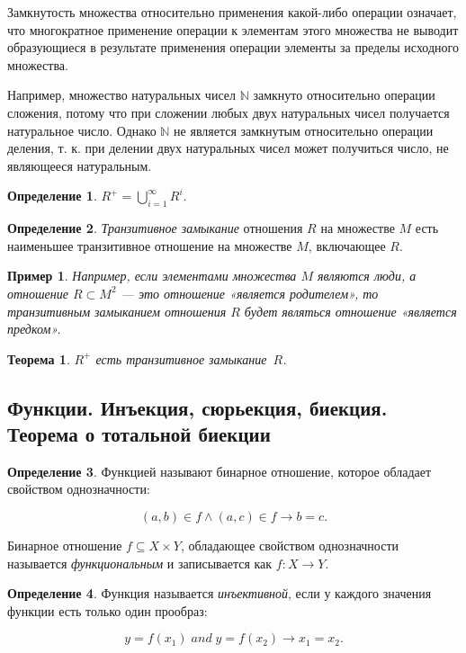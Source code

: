 \documentclass{article}
\newtheorem*{theorem*}{Теорема}
\theoremstyle{plain}
\newtheorem*{example*}{Пример}
\theoremstyle{definition}
\newtheorem{definition}{Определение}[subsection]
\begin{document}
Замкнутость множества относительно применения какой-либо операции означает, что многократное применение операции к элементам этого множества не выводит образующиеся в результате применения операции элементы за пределы исходного множества.

Например, множество натуральных чисел \(\mathbb{N}\) замкнуто относительно операции сложения, потому что при сложении любых двух натуральных чисел получается натуральное число. Однако \(\mathbb{N}\) не является замкнутым относительно операции деления, т. к. при делении двух натуральных чисел может получиться число, не являющееся натуральным.

\begin{definition}
	\(R^+ = \bigcup \limits ^{{\infty}} _{{i = 1}}R^{i}.\)
\end{definition}

\begin{definition}
	\textit{Транзитивное замыкание} отношения \(R\) на множестве \(M\) есть наименьшее транзитивное отношение на множестве \(M\), включающее \(R\).
\end{definition}

\begin{example*}
	Например, если элементами множества \(M\) являются люди, а отношение \(R \subset M^2\) — это отношение «является родителем», то транзитивным замыканием отношения \(R\) будет являться отношение «является предком».
\end{example*}

\begin{theorem*}
	\(R^+\) есть транзитивное замыкание~\(R\).
\end{theorem*}

\subsection{Функции. Инъекция, сюрьекция, биекция. Теорема о тотальной биекции}

\begin{definition}
	Функцией называют бинарное отношение, которое обладает свойством однозначности:

	\[
		(a, b) \in f \land (a, c) \in f \rightarrow b = c.
	\]
\end{definition}

Бинарное отношение \(f \subseteq X \times Y\), обладающее свойством однозначности называется \textit{функциональным} и записывается как \(f \colon X \rightarrow Y\).

\begin{definition}
	Функция называется \textit{инъективной}, если у каждого значения функции есть только один прообраз:

	\[
		y = f(x_1) \;and\; y = f(x_2) \rightarrow x_1 = x_2.
	\]
\end{definition}
\end{document}

